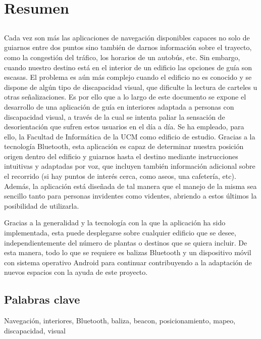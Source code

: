 \chapter*{Resumen}

\section*{\tituloPortadaVal}



Cada vez son más las aplicaciones de navegación disponibles capaces no solo de guiarnos entre dos puntos sino también de darnos información sobre el trayecto, como la congestión del tráfico, los horarios de un autobús, etc. Sin embargo, cuando nuestro destino está en el interior de un edificio las opciones de guía son escasas. El problema es aún más complejo cuando el edificio no es conocido y se dispone de algún tipo de discapacidad visual, que dificulte la lectura de carteles u otras señalizaciones. Es por ello que a lo largo de este documento se expone el desarrollo de una aplicación de guía en interiores adaptada a personas con discapacidad visual, a través de la cual se intenta paliar la sensación de desorientación que sufren estos usuarios en el día a día. Se ha empleado, para ello, la Facultad de Informática de la UCM como edificio de estudio. Gracias a la tecnología Bluetooth, esta aplicación es capaz de determinar nuestra posición origen dentro del edificio y guiarnos hasta el destino mediante instrucciones intuitivas y adaptadas por voz, que incluyen también información adicional sobre el recorrido (si hay puntos de interés cerca, como aseos, una cafetería, etc). Además, la aplicación está diseñada de tal manera que el manejo de la misma sea sencillo tanto para personas invidentes como videntes, abriendo a estos últimos la posibilidad de utilizarla.

Gracias a la generalidad y la tecnología con la que la aplicación ha sido implementada, esta puede desplegarse sobre cualquier edificio que se desee, independientemente del número de plantas o destinos que se quiera incluir.  De esta manera, todo lo que se requiere es balizas Bluetooth y un dispositivo móvil con sistema operativo Android para continuar contribuyendo a la adaptación de nuevos espacios con la ayuda de este proyecto.

\section*{Palabras clave}
   
\noindent Navegación, interiores, Bluetooth, baliza, beacon, posicionamiento, mapeo, discapacidad, visual
   


